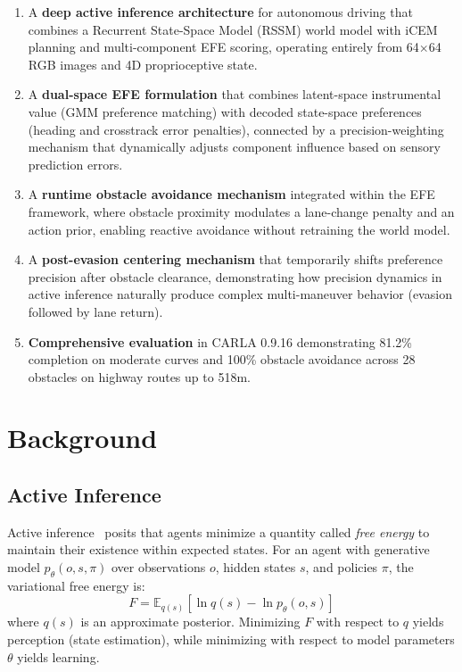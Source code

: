 \documentclass[conference]{IEEEtran}
\begin{document}
\begin{enumerate}
    \item A \textbf{deep active inference architecture} for autonomous driving that combines a Recurrent State-Space Model (RSSM) world model with iCEM planning and multi-component EFE scoring, operating entirely from 64$\times$64 RGB images and 4D proprioceptive state.

    \item A \textbf{dual-space EFE formulation} that combines latent-space instrumental value (GMM preference matching) with decoded state-space preferences (heading and crosstrack error penalties), connected by a precision-weighting mechanism that dynamically adjusts component influence based on sensory prediction errors.

    \item A \textbf{runtime obstacle avoidance mechanism} integrated within the EFE framework, where obstacle proximity modulates a lane-change penalty and an action prior, enabling reactive avoidance without retraining the world model.

    \item A \textbf{post-evasion centering mechanism} that temporarily shifts preference precision after obstacle clearance, demonstrating how precision dynamics in active inference naturally produce complex multi-maneuver behavior (evasion followed by lane return).

    \item \textbf{Comprehensive evaluation} in CARLA 0.9.16 demonstrating 81.2\% completion on moderate curves and 100\% obstacle avoidance across 28 obstacles on highway routes up to 518m.
\end{enumerate}

\section{Background}
\label{sec:background}

\subsection{Active Inference}

Active inference~\cite{friston2010free} posits that agents minimize a quantity called \emph{free energy} to maintain their existence within expected states. For an agent with generative model $p_\theta(o, s, \pi)$ over observations $o$, hidden states $s$, and policies $\pi$, the variational free energy is:
\begin{equation}
    F = \mathbb{E}_{q(s)}[\ln q(s) - \ln p_\theta(o, s)]
\end{equation}
where $q(s)$ is an approximate posterior. Minimizing $F$ with respect to $q$ yields perception (state estimation), while minimizing with respect to model parameters $\theta$ yields learning.
\end{document}
